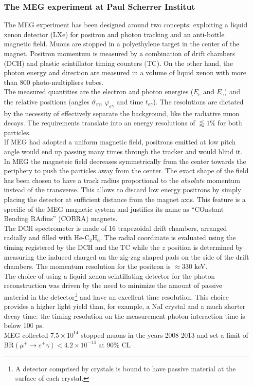 \documentclass[12pt,a4paper,openright, oneside, titlepage]{book} %
\begin{document}
\subsubsection{The MEG experiment at Paul Scherrer Institut}
The MEG experiment \cite{MEG} has been designed around two concepts: 
exploiting a liquid xenon detector (LXe) for positron and photon tracking and an anti-bottle magnetic field. 
Muons are stopped in a polyethylene target in the center of the magnet. Positron momentum is measured by a combination of drift chambers (DCH) and plastic scintillator timing counters (TC). 
On the other hand, the photon energy and direction are measured in a volume of liquid xenon with more than 800 photo-multipliers tubes.\\
The measured quantities are the electron and photon energies ($E_e$ and $E_\gamma$) and the relative positions (angles $\vartheta_{e\gamma}$, $\varphi_{e\gamma}$ and time $t_{e\gamma}$). The resolutions are dictated by the necessity of effectively separate the background, like the radiative muon decays. 
The requirements translate into an energy resolutions of $\lessapprox 1\%$ for both particles.\\
If MEG had adopted a uniform magnetic field, positrons emitted at low pitch angle would end up passing many times through the tracker and would blind it. In MEG the magneteic field decreases symmetrically from the center towards the periphery to push the particles away from the center. The exact shape of the field has been chosen to have a track radius proportional to the \textit{absolute} momentum instead of the transverse. 
This allows to discard low energy positrons by simply placing the detector at sufficient distance from the magnet axis. 
This feature is a specific of the MEG magnetic system and justifies its name as ``COnstant Bending RAdius'' (COBRA) magnets.\\
The DCH spectrometer is made of 16 trapezoidal drift chambers, arranged radially and filled with He-C$_2$H$_6$. The radial coordinate is evaluated using the timing registered by the DCH and the TC while the $z$ position is determined by measuring the induced charged on the zig-zag shaped pads on the side of the drift chambers. The momentum resolution for the positron is $\approx330$ keV.\\
The choice of using a liquid xenon scintillating detector for the photon reconstruction was driven by the need to minimize
the amount of passive material in the detector\footnote{A detector comprised by crystals is bound to have passive material at the surface of each crystal.} and have an excellent time resolution. 
This choice provides a higher light yield than, for example, a NaI crystal and a much shorter decay time: 
the timing resolution on the measurement photon interaction time is below 100 ps.\\
MEG collected $7.5\times10^{14}$ stopped muons in the years 2008-2013 and set a limit of BR$(\mu^+\rightarrow e^+\gamma)<4.2\times10^{-13}$ at 90\% CL \cite{MEG}.
\end{document}
